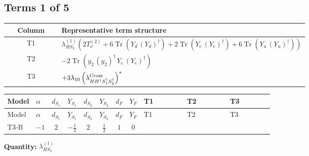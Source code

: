 \documentclass[8pt]{article}
\begin{document}
\begin{landscape}
\subsection*{Terms 1 of 5}
\begin{center}
\begin{tabular}{@{}c >{\raggedright\arraybackslash}p{0.82\linewidth}@{}}
\toprule
Column & Representative term structure \\
\midrule
T1 & \(\displaystyle {\lambda_{HS_2}^{(1)}} (2 T_{\nu}^{(2)}+6 \operatorname{Tr}\!\left({Y_d}\,\left({Y_d}\right)^{\dagger}\right)+2 \operatorname{Tr}\!\left({Y_e}\,\left({Y_e}\right)^{\dagger}\right)+6 \operatorname{Tr}\!\left({Y_u}\,\left({Y_u}\right)^{\dagger}\right))\) \\
\midrule
T2 & \(\displaystyle -2 \operatorname{Tr}\!\left({y_2}\,\left({y_2}\right)^{\dagger}\,{Y_e}\,\left({Y_e}\right)^{\dagger}\right)\) \\
\midrule
T3 & \(\displaystyle +3 {\lambda_{10}} \left({\lambda_{H H^\dagger S_1^\dagger S_2^\dagger}^{\rm Cross}}\right)^{*}\) \\
\midrule
\bottomrule
\end{tabular}
\end{center}
\smallskip
\tiny
\begin{longtable}{@{}llcccccc >{\raggedright\arraybackslash}p{0.21\linewidth} >{\raggedright\arraybackslash}p{0.21\linewidth} >{\raggedright\arraybackslash}p{0.21\linewidth}@{}}
\toprule
Model & $\alpha$ & $d_{S_1}$ & $Y_{S_1}$ & $d_{S_2}$ & $Y_{S_2}$ & $d_F$ & $Y_F$ & T1 & T2 & T3 \\
\midrule
\endfirsthead
\toprule
Model & $\alpha$ & $d_{S_1}$ & $Y_{S_1}$ & $d_{S_2}$ & $Y_{S_2}$ & $d_F$ & $Y_F$ & T1 & T2 & T3 \\
\midrule
\endhead
T3-B & $-1$ & $2$ & $-\frac{1}{2}$ & $2$ & $\frac{1}{2}$ & $1$ & $0$ & \scriptsize\adjustbox{max width=\linewidth}{$\begin{gathered} {\lambda_{HS_2}^{(1)}} (2 T_{\nu}^{(2)}+6 \operatorname{Tr}\!\left({Y_d}\,\left({Y_d}\right)^{\dagger}\right)+2 \operatorname{Tr}\!\left({Y_e}\,\left({Y_e}\right)^{\dagger}\right)+6 \operatorname{Tr}\!\left({Y_u}\,\left({Y_u}\right)^{\dagger}\right))\end{gathered}$} & \scriptsize\adjustbox{max width=\linewidth}{$\begin{gathered} -2 \operatorname{Tr}\!\left({y_2}\,\left({y_2}\right)^{\dagger}\,{Y_e}\,\left({Y_e}\right)^{\dagger}\right)\end{gathered}$} & \scriptsize\adjustbox{max width=\linewidth}{$\begin{gathered} +3 {\lambda_{10}} \left({\lambda_{H H^\dagger S_1^\dagger S_2^\dagger}^{\rm Cross}}\right)^{*}\end{gathered}$} \\
\midrule
\bottomrule
\end{longtable}
\clearpage
\noindent\textbf{Quantity: }$\lambda_{HS_2}^{(1)}$\par\smallskip

\end{landscape}
\end{document}
